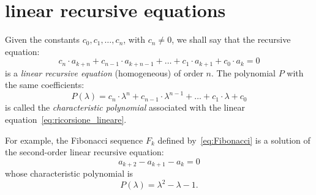 \section{linear recursive equations}
\label{sec:ricorrenza_lineare}

Given the constants $c_0, c_1, \dots, c_n$,
with $c_n \neq 0$,
we shall say that the recursive equation:
\begin{equation}\label{eq:ricorsione_lineare}
  c_n \cdot a_{k+n} + c_{n-1} \cdot a_{k+n-1} + \dots
    + c_1 \cdot a_{k+1} + c_0 \cdot a_k = 0
\end{equation}
is a \emph{linear recursive equation}%
 (homogeneous) of order $n$.
The polynomial $P$ with the same coefficients:
\[
    P(\lambda) = c_n \cdot \lambda^n + c_{n-1}\cdot \lambda^{n-1} + \dots + c_1
  \cdot \lambda + c_0
\]
is called the \emph{characteristic polynomial}%
%
%
associated with the linear equation~\eqref{eq:ricorsione_lineare}.

For example, the Fibonacci sequence $F_k$ defined by~\eqref{eq:Fibonacci}
is a solution of the second-order linear recursive equation:
\[
   a_{k+2} - a_{k+1} - a_{k} = 0
\]
whose characteristic polynomial is
\[
  P(\lambda) = \lambda^2 - \lambda - 1.
\]

